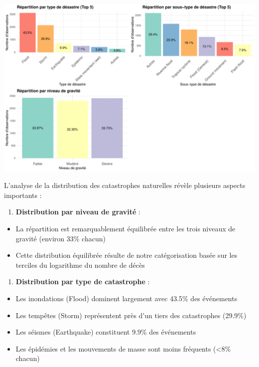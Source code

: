 \documentclass[
]{article}
\providecommand{\tightlist}{%
  \setlength{\itemsep}{0pt}\setlength{\parskip}{0pt}}
\begin{document}
\begin{center}\includegraphics[width=1\linewidth]{Projet_ML_files/figure-latex/unnamed-chunk-2-2} \end{center}

L'analyse de la distribution des catastrophes naturelles révèle
plusieurs aspects importants :

\begin{enumerate}
\def\labelenumi{\arabic{enumi}.}
\tightlist
\item
  \textbf{Distribution par niveau de gravité} :
\end{enumerate}

\begin{itemize}
\tightlist
\item
  La répartition est remarquablement équilibrée entre les trois niveaux
  de gravité (environ 33\% chacun)
\item
  Cette distribution équilibrée résulte de notre catégorisation basée
  sur les terciles du logarithme du nombre de décès
\end{itemize}

\begin{enumerate}
\def\labelenumi{\arabic{enumi}.}
\setcounter{enumi}{1}
\tightlist
\item
  \textbf{Distribution par type de catastrophe} :
\end{enumerate}

\begin{itemize}
\tightlist
\item
  Les inondations (Flood) dominent largement avec 43.5\% des événements
\item
  Les tempêtes (Storm) représentent près d'un tiers des catastrophes
  (29.9\%)
\item
  Les séismes (Earthquake) constituent 9.9\% des événements
\item
  Les épidémies et les mouvements de masse sont moins fréquents
  (\textless8\% chacun)
\end{itemize}
\end{document}
